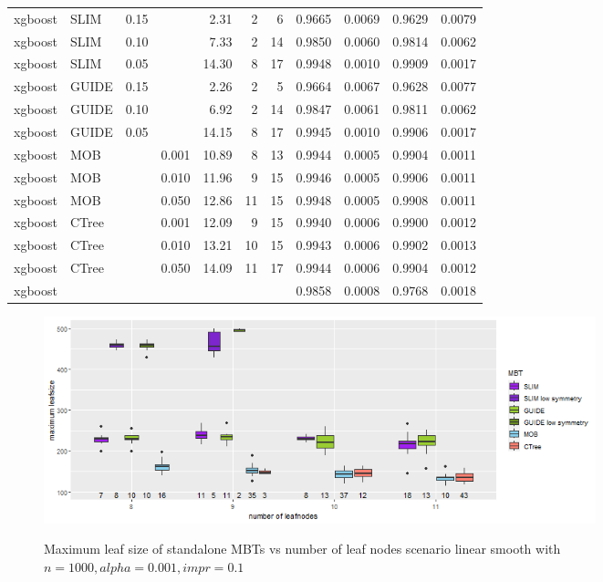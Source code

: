 \begin{table}
\begin{tabular}[t]{l|l|r|r|r|r|r|r|r|r|r}
xgboost & SLIM & 0.15 & & 2.31 & 2 & 6 & 0.9665 & 0.0069 & 0.9629 & 0.0079\\
xgboost & SLIM & 0.10 & & 7.33 & 2 & 14 & 0.9850 & 0.0060 & 0.9814 & 0.0062\\
xgboost & SLIM & 0.05 & & 14.30 & 8 & 17 & 0.9948 & 0.0010 & 0.9909 & 0.0017\\
xgboost & GUIDE & 0.15 & & 2.26 & 2 & 5 & 0.9664 & 0.0067 & 0.9628 & 0.0077\\
xgboost & GUIDE & 0.10 & & 6.92 & 2 & 14 & 0.9847 & 0.0061 & 0.9811 & 0.0062\\
xgboost & GUIDE & 0.05 & & 14.15 & 8 & 17 & 0.9945 & 0.0010 & 0.9906 & 0.0017\\
xgboost & MOB & & 0.001 & 10.89 & 8 & 13 & 0.9944 & 0.0005 & 0.9904 & 0.0011\\
xgboost & MOB & & 0.010 & 11.96 & 9 & 15 & 0.9946 & 0.0005 & 0.9906 & 0.0011\\
xgboost & MOB & & 0.050 & 12.86 & 11 & 15 & 0.9948 & 0.0005 & 0.9908 & 0.0011\\
xgboost & CTree & & 0.001 & 12.09 & 9 & 15 & 0.9940 & 0.0006 & 0.9900 & 0.0012\\
xgboost & CTree & & 0.010 & 13.21 & 10 & 15 & 0.9943 & 0.0006 & 0.9902 & 0.0013\\
xgboost & CTree & & 0.050 & 14.09 & 11 & 17 & 0.9944 & 0.0006 & 0.9904 & 0.0012\\
\hline
xgboost &  & & &  &  &  & 0.9858 & 0.0008 & 0.9768 & 0.0018\\
\hline
\end{tabular}
\label{tab:app_linear_smooth_1000}
\end{table}


\begin{figure} 
\caption{Maximum leaf size of standalone MBTs vs number of leaf nodes scenario linear smooth with $n=1000, alpha = 0.001, impr = 0.1$}
    \includegraphics[width=16cm]{Figures/simulations/batchtools/basic_scenarios/linear_smooth/ls_1000_standalone_symmetrie.png}
    \label{fig:ls_1000_standalone_symmetrie}
\end{figure} 


